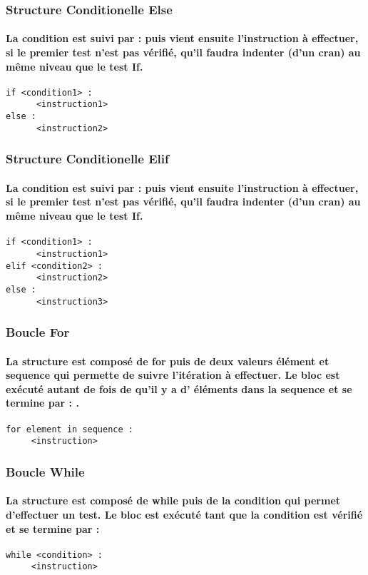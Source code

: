 \documentclass[a4paper, 12pt, twoside]{article}
\begin{document}
\subsubsection{ Structure Conditionelle Else}
\paragraph{La condition est suivi par  :  puis vient ensuite l'instruction à effectuer, si le premier test n'est pas vérifié, qu'il faudra indenter (d'un cran) au même niveau que le test If.}
\begin{verbatim}
if <condition1> :
      <instruction1>
else :
      <instruction2>
\end{verbatim}
\subsubsection{ Structure Conditionelle Elif }
\paragraph{La condition est suivi par  :  puis vient ensuite l'instruction à effectuer, si le premier test n'est pas vérifié, qu'il faudra indenter (d'un cran) au même niveau que le test If.}
\begin{verbatim}
if <condition1> :
      <instruction1>
elif <condition2> :
      <instruction2>
else : 
      <instruction3>
\end{verbatim}
\subsubsection{ Boucle For}
\paragraph{La structure est composé de for puis de deux valeurs élément et sequence qui permette de suivre l'itération à effectuer. Le bloc 
est exécuté autant de fois de qu'il y a d' éléments dans la sequence et se termine par  : .}
\begin{verbatim}
for element in sequence :
     <instruction>
\end{verbatim}
\subsubsection{ Boucle While }
\paragraph{La structure est composé de while puis de la condition qui permet d'effectuer un test. Le bloc est exécuté tant que la condition est vérifié et se termine par  : }
\begin{verbatim}
while <condition> :
     <instruction>
\end{verbatim}
\end{document}
